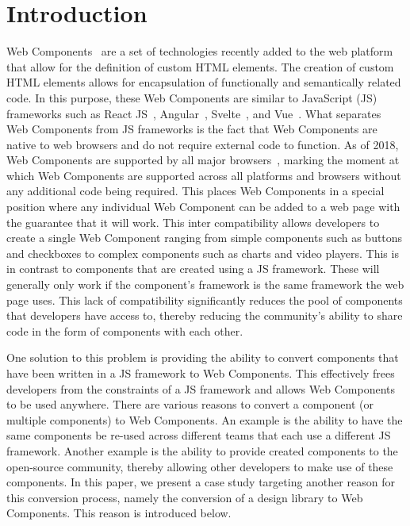 \chapter{Introduction}
Web Components~ are a set of technologies recently added to the web platform that allow for the definition of custom HTML elements. The creation of custom HTML elements allows for encapsulation of functionally and semantically related code. In this purpose, these Web Components are similar to JavaScript (JS) frameworks such as React JS~, Angular~, Svelte~, and Vue~. What separates Web Components from JS frameworks is the fact that Web Components are native to web browsers and do not require external code to function. As of 2018, Web Components are supported by all major browsers~, marking the moment at which Web Components are supported across all platforms and browsers without any additional code being required. This places Web Components in a special position where any individual Web Component can be added to a web page with the guarantee that it will work. This inter compatibility allows developers to create a single Web Component ranging from simple components such as buttons and checkboxes to complex components such as charts and video players. This is in contrast to components that are created using a JS framework. These will generally only work if the component's framework is the same framework the web page uses. This lack of compatibility significantly reduces the pool of components that developers have access to, thereby reducing the community's ability to share code in the form of components with each other.

One solution to this problem is providing the ability to convert components that have been written in a JS framework to Web Components. This effectively frees developers from the constraints of a JS framework and allows Web Components to be used anywhere. There are various reasons to convert a component (or multiple components) to Web Components. An example is the ability to have the same components be re-used across different teams that each use a different JS framework. Another example is the ability to provide created components to the open-source community, thereby allowing other developers to make use of these components. In this paper, we present a case study targeting another reason for this conversion process, namely the conversion of a design library to Web Components. This reason is introduced below.

